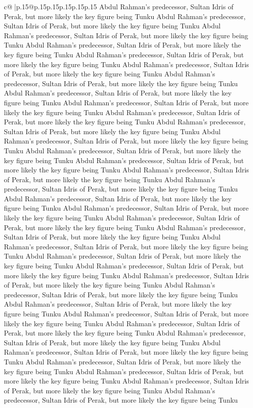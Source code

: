 \documentclass{article}
\begin{document}
{\begin{supertabular}{c@{$\;$}|p{.15\linewidth}@{}p{.15\linewidth}p{.15\linewidth}p{.15\linewidth}p{.15\linewidth}p{.15\linewidth}}
{{{Abdul Rahman's predecessor, Sultan Idris of Perak, but more likely the key figure being Tunku Abdul Rahman's predecessor, Sultan Idris of Perak, but more likely the key figure being Tunku Abdul Rahman's predecessor, Sultan Idris of Perak, but more likely the key figure being Tunku Abdul Rahman's predecessor, Sultan Idris of Perak, but more likely the key figure being Tunku Abdul Rahman's predecessor, Sultan Idris of Perak, but more likely the key figure being Tunku Abdul Rahman's predecessor, Sultan Idris of Perak, but more likely the key figure being Tunku Abdul Rahman's predecessor, Sultan Idris of Perak, but more likely the key figure being Tunku Abdul Rahman's predecessor, Sultan Idris of Perak, but more likely the key figure being Tunku Abdul Rahman's predecessor, Sultan Idris of Perak, but more likely the key figure being Tunku Abdul Rahman's predecessor, Sultan Idris of Perak, but more likely the key figure being Tunku Abdul Rahman's predecessor, Sultan Idris of Perak, but more likely the key figure being Tunku Abdul Rahman's predecessor, Sultan Idris of Perak, but more likely the key figure being Tunku Abdul Rahman's predecessor, Sultan Idris of Perak, but more likely the key figure being Tunku Abdul Rahman's predecessor, Sultan Idris of Perak, but more likely the key figure being Tunku Abdul Rahman's predecessor, Sultan Idris of Perak, but more likely the key figure being Tunku Abdul Rahman's predecessor, Sultan Idris of Perak, but more likely the key figure being Tunku Abdul Rahman's predecessor, Sultan Idris of Perak, but more likely the key figure being Tunku Abdul Rahman's predecessor, Sultan Idris of Perak, but more likely the key figure being Tunku Abdul Rahman's predecessor, Sultan Idris of Perak, but more likely the key figure being Tunku Abdul Rahman's predecessor, Sultan Idris of Perak, but more likely the key figure being Tunku Abdul Rahman's predecessor, Sultan Idris of Perak, but more likely the key figure being Tunku Abdul Rahman's predecessor, Sultan Idris of Perak, but more likely the key figure being Tunku Abdul Rahman's predecessor, Sultan Idris of Perak, but more likely the key figure being Tunku Abdul Rahman's predecessor, Sultan Idris of Perak, but more likely the key figure being Tunku Abdul Rahman's predecessor, Sultan Idris of Perak, but more likely the key figure being Tunku Abdul Rahman's predecessor, Sultan Idris of Perak, but more likely the key figure being Tunku Abdul Rahman's predecessor, Sultan Idris of Perak, but more likely the key figure being Tunku Abdul Rahman's predecessor, Sultan Idris of Perak, but more likely the key figure being Tunku Abdul Rahman's predecessor, Sultan Idris of Perak, but more likely the key figure being Tunku Abdul Rahman's predecessor, Sultan Idris of Perak, but more likely the key figure being Tunku Abdul Rahman's predecessor, Sultan Idris of Perak, but more likely the key figure being Tunku Abdul Rahman's predecessor, Sultan Idris of Perak, but more likely the key figure being Tunku Abdul Rahman's predecessor, Sultan Idris of Perak, but more likely the key figure being Tunku Abdul Rahman's predecessor, Sultan Idris of Perak, but more likely the key figure being Tunku }}}
\end{supertabular}}
\end{document}
